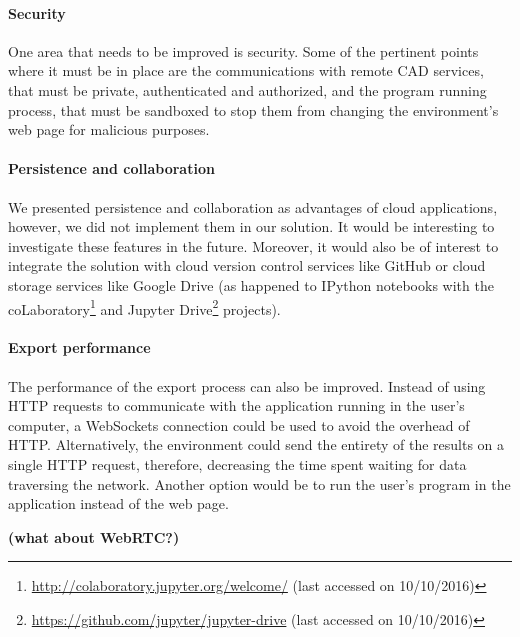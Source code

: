 \paragraph{Security}
One area that needs to be improved is security.
Some of the pertinent points where it must be in place are the communications with remote CAD services, that must be private, authenticated and authorized, and the program running process, that must be sandboxed to stop them from changing the environment's web page for malicious purposes.

\paragraph{Persistence and collaboration}
We presented persistence and collaboration as advantages of cloud applications, however, we did not implement them in our solution.
It would be interesting to investigate these features in the future.
Moreover, it would also be of interest to integrate the solution with cloud version control services like GitHub or cloud storage services like Google Drive (as happened to IPython notebooks with the coLaboratory\footnote{\url{http://colaboratory.jupyter.org/welcome/} (last accessed on 10/10/2016)} and Jupyter Drive\footnote{\url{https://github.com/jupyter/jupyter-drive} (last accessed on 10/10/2016)} projects).

\paragraph{Export performance}
The performance of the export process can also be improved.
Instead of using HTTP requests to communicate with the application running in the user's computer, a WebSockets connection\cite{rfc6455} could be used to avoid the overhead of HTTP.
Alternatively, the environment could send the entirety of the results on a single HTTP request, therefore, decreasing the time spent waiting for data traversing the network.
Another option would be to run the user's program in the application instead of the web page.

{\bf(what about WebRTC?)}








